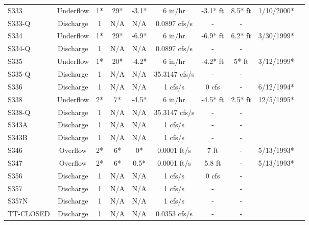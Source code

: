 \begin{table}[h]
\begin{tabular}{@{}lccccccccc@{}}
{S333}          & Underflow     & 1*       & 29*         & -3.1*        & 6 in/hr        & -3.1* ft        & 8.5* ft    & 1/10/2000*  \\
{S333-Q}        & Discharge     & 1        & N/A         & N/A          & 0.0897 cfs/s   & -               & -          &             \\
{S334}          & Underflow     & 1*       & 29*         & -6.9*        & 6 in/hr        & -6.9* ft        & 6.2* ft    & 3/30/1999*  \\
{S334-Q}        & Discharge     & 1        & N/A         & N/A          & 0.0897 cfs/s   & -               & -          &             \\
{S335}          & Underflow     & 1*       & 20*         & -4.2*        & 6 in/hr        & -4.2* ft        & 5* ft      & 3/12/1999*  \\
{S335-Q}        & Discharge     & 1        & N/A         & N/A          & 35.3147 cfs/s  & -               & -          &             \\
{S336}          & Discharge     & 1        & N/A         & N/A          & 1 cfs/s        &  0 cfs          & -          & 6/12/1994*  \\
{S338}          & Underflow     & 2*       & 7*          & -4.5*        & 6 in/hr        &  -4.5* ft       & 2.5* ft    & 12/5/1995*  \\
{S338-Q}        & Discharge     & 1        & N/A         & N/A          & 35.3147 cfs/s  &  -              & -          &             \\
{S343A}         & Discharge     & 1        & N/A         & N/A          & 1 cfs/s        &  -              & -          &             \\
{S343B}         & Discharge     & 1        & N/A         & N/A          & 1 cfs/s        &  -              & -          &             \\
{S346}          & Overflow      & 2*       & 6*          & 0*           & 0.0001 ft/s    &  7 ft           & -          & 5/13/1993*  \\
{S347}          & Overflow      & 2*       & 6*          & 0.5*         & 0.0001 ft/s    &  5.8 ft         & -          & 5/13/1993*  \\
{S356}          & Discharge     & 1        & N/A         & N/A          & 1 cfs/s        &  0 cfs          & -          &             \\
{S357}          & Discharge     & 1        & N/A         & N/A          & 1 cfs/s        &  -              & -          &             \\
{S357N}         & Discharge     & 1        & N/A         & N/A          & 1 cfs/s        &  -              & -          &             \\
{TT-CLOSED}     & Discharge     & 1        & N/A         & N/A          & 0.0353 cfs/s   &  -              & -          &             \\
\hline
\end{tabular}


\end{table}

